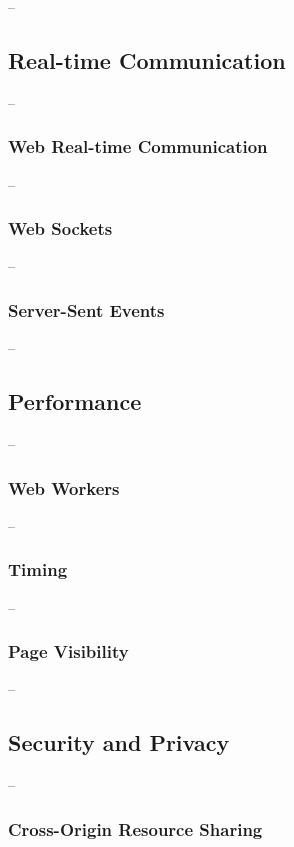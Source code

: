 --

\subsection{Real-time Communication}

--

\subsubsection{Web Real-time Communication}

--

\subsubsection{Web Sockets}

--

\subsubsection{Server-Sent Events}

--

\subsection{Performance}

--

\subsubsection{Web Workers}

--

\subsubsection{Timing}

--

\subsubsection{Page Visibility}

--

\subsection{Security and Privacy}

--

\subsubsection{Cross-Origin Resource Sharing}


